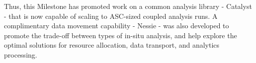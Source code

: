 Thus, this Milestone has promoted work on a common analysis library - Catalyst - that is now capable of scaling to ASC-sized coupled analysis runs.  A complimentary data movement capability - Nessie - was also developed to promote the trade-off between types of in-situ analysis, and help explore the optimal solutions for resource allocation, data transport, and analytics processing.

